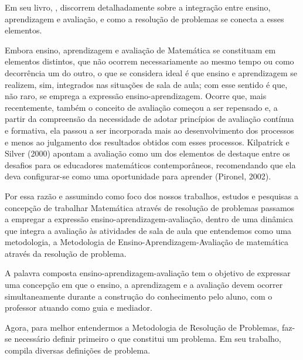 Em seu livro, , discorrem detalhadamente sobre a integração entre ensino, aprendizagem e avaliação, e como a resolução de problemas se conecta a esses elementos.

\begin{citacao}
    Embora ensino, aprendizagem e avaliação de Matemática se constituam em elementos distintos, que não ocorrem necessariamente ao mesmo tempo ou como decorrência um do outro, o que se considera ideal é que ensino e aprendizagem se realizem, sim, integrados nas situações de sala de aula; com esse sentido é que, não raro, se emprega a expressão ensino-aprendizagem. Ocorre que, mais recentemente, também o conceito de avaliação começou a ser repensado e, a partir da compreensão da necessidade de adotar princípios de avaliação contínua e formativa, ela passou a ser incorporada mais ao desenvolvimento dos processos e menos ao julgamento dos resultados obtidos com esses processos. Kilpatrick e Silver (2000) apontam a avaliação como um dos elementos de destaque entre os desafios para os educadores matemáticos contemporâneos, recomendando que ela deva configurar-se como uma oportunidade para aprender (Pironel, 2002).

    Por essa razão e assumindo como foco dos nossos trabalhos, estudos e pesquisas a concepção de trabalhar Matemática através de resolução de problemas passamos a empregar a expressão ensino-aprendizagem-avaliação, dentro de uma dinâmica que integra a avaliação às atividades de sala de aula que entendemos como uma metodologia, a Metodologia de Ensino-Aprendizagem-Avaliação de matemática através da resolução de problema.

    A palavra composta ensino-aprendizagem-avaliação tem o objetivo de expressar uma concepção em que o ensino, a aprendizagem e a avaliação devem ocorrer simultaneamente durante a construção do conhecimento pelo aluno, com o professor atuando como guia e mediador. \cite{resolucaoDeProblemas2014}
\end{citacao}

Agora, para melhor entendermos a Metodologia de Resolução de Problemas, faz-se necessário definir primeiro o que constitui um problema. Em seu trabalho,  compila diversas definições de problema.

